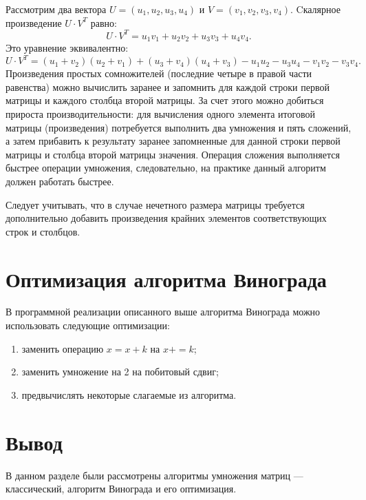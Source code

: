 Рассмотрим два вектора $U = (u_1, u_2, u_3, u_4)$ и $V = (v_1, v_2, v_3, v_4)$.\newline
Cкалярное произведение $U \cdot V^T$ равно:
\begin{equation}
U \cdot V^T = u_1v_1 + u_2v_2 + u_3v_3 + u_4v_4.
\end{equation}
Это уравнение эквивалентно:
\begin{equation}
	\label{for:new}
	U \cdot V^T = (u_1 + v_2)(u_2 + v_1) + (u_3 + v_4)(u_4 + v_3) - u_1u_2 - u_3u_4 - v_1v_2 - v_3v_4.
\end{equation}
Произведения простых сомножителей (последние четыре в правой части равенства) можно вычислить заранее и запомнить для каждой строки первой матрицы и каждого столбца второй матрицы. 
За счет этого можно добиться прироста производительности: для вычисления одного элемента итоговой матрицы (произведения) потребуется выполнить два умножения и пять сложений, а затем прибавить к результату заранее запомненные для данной строки первой матрицы и столбца второй матрицы значения. 
Операция сложения выполняется быстрее операции умножения, следовательно, на практике данный алгоритм должен работать быстрее.

Следует учитывать, что в случае нечетного размера матрицы требуется дополнительно добавить произведения крайних элементов соответствующих строк и столбцов.

\section{Оптимизация алгоритма Винограда}
В программной реализации описанного выше алгоритма Винограда можно использовать следующие оптимизации:
\begin{enumerate}
	\item заменить операцию $x = x + k$ на $x += k$;
	\item заменить умножение на 2 на побитовый сдвиг; 
	\item предвычислять некоторые слагаемые из алгоритма.
\end{enumerate}

\section*{Вывод}
В данном разделе были рассмотрены алгоритмы умножения матриц --- классический, алгоритм Винограда и его оптимизация.